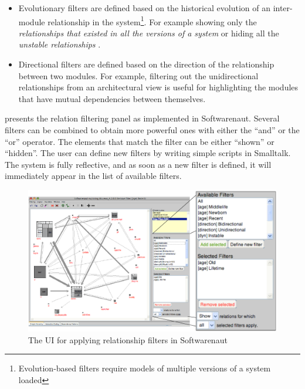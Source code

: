 \documentclass[preprint,12pt]{elsarticle}
\begin{document}
\begin{itemize}
\item Evolutionary filters are defined based on the historical evolution of an inter-module relationship in the system\footnote{Evolution-based filters require models of multiple versions of a system loaded}. %
For example showing only the {\em relationships that existed in all the versions of a system} or hiding all the {\em unstable relationships} \cite{lungu-relevo}.


\item Directional filters are defined based on the direction of the relationship between two modules. For example, filtering out the unidirectional relationships from an architectural view is useful for highlighting the modules that have mutual dependencies between themselves. 
\end{itemize}


 presents the relation filtering panel as implemented in Softwarenaut. Several filters can be combined to obtain more powerful ones with either the ``and'' or the ``or'' operator. The elements that match the filter can be either ``shown'' or ``hidden''. The user can define new filters by writing simple scripts in Smalltalk. The system is fully reflective, and as soon as a new filter is defined, it will immediately appear in the list of available filters.

\begin{figure}[h]
\begin{center}
\includegraphics[width=\linewidth]{SnautFilteringPanel}
\caption{The UI for applying relationship filters in Softwarenaut}
\end{center}
\end{figure}
\end{document}
